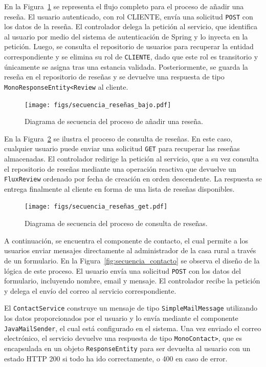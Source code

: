 En la Figura~\ref{fig:secuencia_reseña_add} se representa el flujo completo para el proceso de añadir una reseña. El usuario autenticado, con rol CLIENTE, envía una solicitud \texttt{POST} con los datos de la reseña. El controlador delega la petición al servicio, que identifica al usuario por medio del sistema de autenticación de Spring y lo inyecta en la petición. Luego, se consulta el repositorio de usuarios para recuperar la entidad correspondiente y se elimina su rol de \texttt{CLIENTE}, dado que este rol es transitorio y únicamente se asigna tras una estancia validada. Posteriormente, se guarda la reseña en el repositorio de reseñas y se devuelve una respuesta de tipo \texttt{Mono\<ResponseEntity<Review\>\>} al cliente.

\begin{figure}[h!tb]
    \centering
    \texttt{[image: figs/secuencia\_reseñas\_bajo.pdf]}
    \caption{Diagrama de secuencia del proceso de añadir una reseña.\label{fig:secuencia_reseña_add}}
\end{figure}

En la Figura~\ref{fig:secuencia_reseña_get} se ilustra el proceso de consulta de reseñas. En este caso, cualquier usuario puede enviar una solicitud \texttt{GET} para recuperar las reseñas almacenadas. El controlador redirige la petición al servicio, que a su vez consulta el repositorio de reseñas mediante una operación reactiva que devuelve un \texttt{Flux\<Review\>} ordenado por fecha de creación en orden descendente. La respuesta se entrega finalmente al cliente en forma de una lista de reseñas disponibles.

\begin{figure}[h!tb]
    \centering
    \texttt{[image: figs/secuencia\_reseñas\_get.pdf]}
    \caption{Diagrama de secuencia del proceso de consulta de reseñas.\label{fig:secuencia_reseña_get}}
\end{figure}
A continuación, se encuentra el componente de contacto, el cual permite a los usuarios enviar mensajes directamente al administrador de la casa rural a través de un formulario. En la Figura~\ref{fig:secuencia_contacto} se observa el diseño de la lógica de este proceso. El usuario envía una solicitud \texttt{POST} con los datos del formulario, incluyendo nombre, email y mensaje. El controlador recibe la petición y delega el envío del correo al servicio correspondiente.

El \texttt{ContactService} construye un mensaje de tipo \texttt{SimpleMailMessage} utilizando los datos proporcionados por el usuario y lo envía mediante el componente \texttt{JavaMailSender}, el cual está configurado en el sistema. Una vez enviado el correo electrónico, el servicio devuelve una respuesta de tipo \texttt{Mono\<Contact>}, que es encapsulada en un objeto \texttt{ResponseEntity} para ser devuelta al usuario con un estado HTTP 200 si todo ha ido correctamente, o 400 en caso de error.

